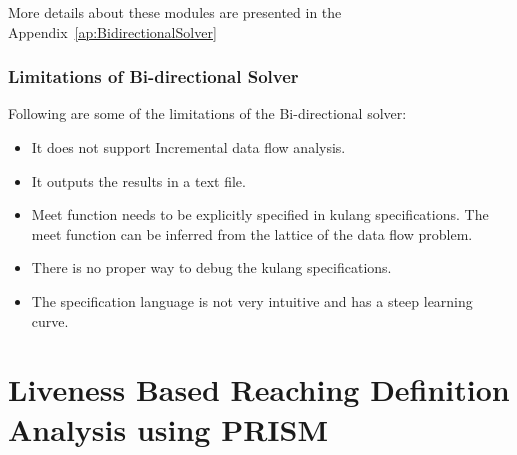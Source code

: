 \documentclass[11pt,a4paper,openright]{report}
\begin{document}
More details about these modules are presented in the Appendix~\ref{ap:BidirectionalSolver}

\subsection{Limitations of Bi-directional Solver}
Following are some of the limitations of the Bi-directional solver:
\begin{itemize}
 \item It does not support Incremental data flow analysis.
 \item It outputs the results in a text file. 
 \item Meet function needs to be explicitly specified in kulang specifications. The meet function can be inferred from
the lattice of the data flow problem.
 \item There is no proper way to debug the kulang specifications.
 \item The specification language is not very intuitive and has a steep learning curve.
\end{itemize}

\chapter{Liveness Based Reaching Definition Analysis using PRISM}
\end{document}
